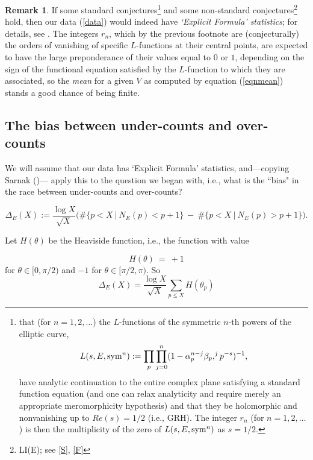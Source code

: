 \documentclass[11pt]{article}
\theoremstyle{plain}
\theoremstyle{definition}
\newtheorem{remark}[theorem]{Remark}
\numberwithin{equation}{section}
\numberwithin{figure}{section}
\numberwithin{table}{section}
\begin{document}
\begin{remark}  If some standard conjectures{\footnote{that (for $n=1,2,\dots$) the $L$-functions of the symmetric $n$-th powers of the elliptic curve, \begin{equation}
L(s, E, {\rm sym}^n): = \prod_p\prod_{j=0}^n(1- \alpha_p^{n-j}\beta_p,^jp^{-s})^{-1},
\end{equation} have analytic continuation   to the entire complex plane satisfying a standard function equation (and one can relax analyticity and require merely an appropriate meromorphicity hypothesis) and that they be holomorphic and nonvanishing up to $Re(s) =1/2$ (i.e., GRH).  The integer $r_n$ (for $n=1,2,\dots$)  is then the multiplicity of the zero of $L(s, E, {\rm sym}^n)$ as $s=1/2$. \vskip20pt }} and some non-standard conjectures{\footnote{LI(E); see  \ref{S}, \ref{F}}}  hold, then our data (\ref{data}) would indeed have {\it `Explicit Formula' statistics}; for details, see \cite{S}.  The integers $r_n$, which by the previous footnote are (conjecturally) the orders of vanishing of specific $L$-functions at their central points, are expected to have the large preponderance of their values equal to  $0$ or $1$, depending on the sign of the functional equation satisfied by the $L$-function to which they are associated,  so the {\it mean} for  a given $V$ as computed by equation (\ref{eqnmean}) stands a good chance of being finite.
\end{remark}


\subsection{The bias between under-counts and over-counts}
  We will assume that our data has `Explicit Formula' statistics, and---copying Sarnak ({\cite{S}})--- apply this to the question we began with, i.e., what is the ``bias" in the race between under-counts and over-counts?

$$\Delta_E(X):={\frac{\log X}{\sqrt X}}\big(\#\{ p < X\ | \ N_E(p) < p+1\}\ - \ \#\{ p < X\ | \ N_E(p) > p+1\}\big).$$


Let $H(\theta)$ be the Heaviside function, i.e., the function with value

\begin{equation}
H(\theta) \ = \ +1
\end{equation}
 for $\theta \in [0, \pi/2)$ and  $-1$ for $\theta \in [\pi/2, \pi)$.  So
\begin{equation}
\Delta_E(X) = {\frac{\log X}{\sqrt X}}\sum_{p\le X} H(\theta_p)
\end{equation}
\end{document}
